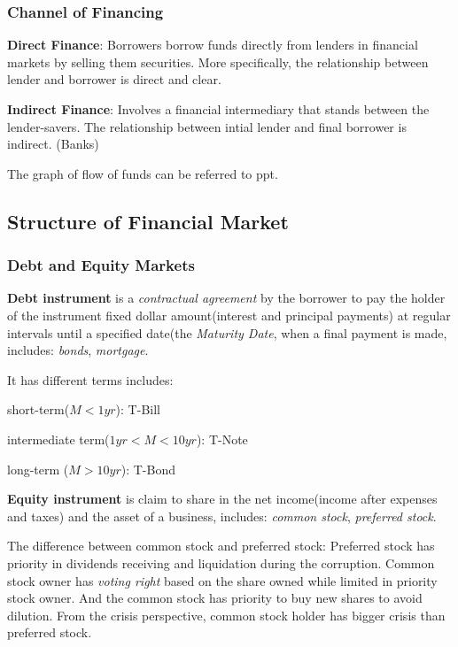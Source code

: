 \documentclass[10pt, a4paper]{article}
\begin{document}
            \subsubsection{Channel of Financing}
                \textbf{Direct Finance}: Borrowers borrow funds directly from lenders in financial markets by selling them securities. More specifically, the relationship between lender and borrower is direct and clear. 

                \textbf{Indirect Finance}: Involves a financial intermediary that stands between the lender-savers. The relationship between intial lender and final  borrower is indirect. (Banks)

                The graph of flow of funds can be referred to ppt.  
        \subsection{Structure of Financial Market}
            \subsubsection{Debt and Equity Markets}
                \textbf{Debt instrument} is a \emph{contractual agreement} by the borrower to pay the holder of the instrument fixed dollar amount(interest and principal payments) at regular intervals until a specified date(the \emph{Maturity Date}, when a final payment is made, includes: \emph{bonds}, \emph{mortgage}.

                It has different terms includes: 
                
                \quad short-term($M < 1yr$): T-Bill

                \quad intermediate term($1yr < M < 10yr$): T-Note
   
                \quad long-term ($M > 10yr$): T-Bond \newline

                \textbf{Equity instrument} is claim to share in the net income(income after expenses and taxes) and the asset of a business, includes: \emph{common stock}, \emph{preferred stock}. 

                The difference between common stock and preferred stock: Preferred stock has priority in dividends receiving and liquidation during the corruption. Common stock owner has \emph{voting right} based on the share owned while limited in priority stock owner. And the common stock has priority to buy new shares to avoid dilution. From the crisis perspective, common stock holder has bigger crisis than preferred stock. 
\end{document}

